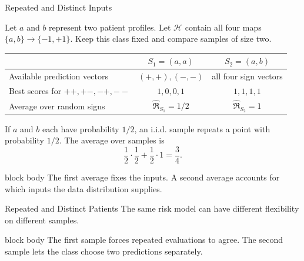 \documentclass[aspectratio=169,10pt]{beamer}
\newcommand{\Hc}{\mathcal{H}}
\newcommand{\Rad}{\mathfrak{R}}
\newcommand{\pmone}{\{-1,+1\}}
\newcommand{\KeyBox}[1]{%
  \begin{beamercolorbox}[rounded=true,sep=0.22cm,wd=\linewidth]{block body}
    #1
  \end{beamercolorbox}%
}
\begin{document}
\begin{frame}[t]{Repeated and Distinct Inputs}
  \vspace{0.04cm}
  \small

  Let $a$ and $b$ represent two patient profiles. Let $\Hc$ contain all
  four maps $\{a,b\}\to\pmone$.
  Keep this class fixed and compare samples of size two.
  \begin{center}
  \renewcommand{\arraystretch}{1.15}
  \begin{tabular}{lcc}
    \toprule
    & $S_1=(a,a)$ & $S_2=(a,b)$\\
    \midrule
    Available prediction vectors & $(+,+),(-,-)$ & all four sign vectors\\
    Best scores for $++,+-,-+,--$ & $1,0,0,1$ & $1,1,1,1$\\
    Average over random signs & $\widehat{\Rad}_{S_1}=1/2$ & $\widehat{\Rad}_{S_2}=1$\\
    \bottomrule
  \end{tabular}
  \end{center}
  If $a$ and $b$ each have probability $1/2$, an i.i.d. sample repeats a
  point with probability $1/2$. The average over samples is
  \[
    \frac12\cdot\frac12+\frac12\cdot1=\frac34.
  \]
  \KeyBox{The first average fixes the inputs. A second average accounts for
  which inputs the data distribution supplies.}

\end{frame}

\begin{frame}[t]{Repeated and Distinct Patients}
  \vspace{0.04cm}\small
  The same risk model can have different flexibility on different samples.
  \begin{center}
  \end{center}
  \vspace{0.08cm}
  \KeyBox{The first sample forces repeated evaluations to agree. The second
  sample lets the class choose two predictions separately.}
\end{frame}
\end{document}
